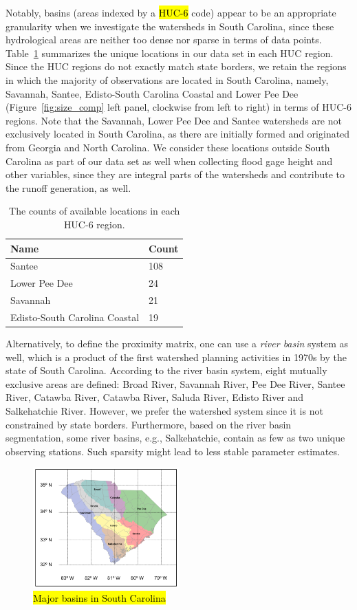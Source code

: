 Notably, basins (areas indexed by a \hl{HUC-6} code) appear to be an appropriate granularity when we investigate the watersheds in South Carolina, since these hydrological areas are neither too dense nor sparse in terms of data points.
Table~\ref{fig:real_huc} summarizes the unique locations in our data set in each HUC region.
Since the HUC regions do not exactly match state borders, we retain the regions in which the majority of observations are located in South Carolina, namely, Savannah, Santee, Edisto-South Carolina Coastal and Lower Pee Dee (Figure~\ref{fig:size_comp} left panel, clockwise from left to right) in terms of HUC-6 regions.
 Note that the Savannah,  Lower Pee Dee and Santee watersheds are not exclusively located in South Carolina, as there are initially formed and originated from Georgia and North Carolina.
 We consider these locations outside South Carolina as part of our data set as well when collecting flood gage height and other variables, since they are integral parts of the watersheds and contribute to the runoff generation, as well.\\

\begin{table}[htbp]
\centering
\begin{tabular}{|l|l|}
\hline
Name & Count\\\hline
Santee & 108\\\hline
Lower Pee Dee&24\\ \hline
Savannah & 21\\ \hline
Edisto-South Carolina Coastal &19\\ \hline
\end{tabular}
\caption{The counts of available locations in each HUC-6 region. }
\label{fig:real_huc}
\end{table}

Alternatively, to define the proximity matrix, one can use a \emph{river basin} system as well, which is a product of the first watershed planning activities in 1970s by the state of South Carolina.
According to the river basin system, eight mutually exclusive areas are defined: Broad River, Savannah River, Pee Dee River, Santee River, Catawba River, Catawba River, Saluda River, Edisto River and Salkehatchie River.
 However, we prefer the watershed system since it is not constrained by state borders.
 Furthermore, based on the river basin  segmentation, some river basins, e.g., Salkehatchie, contain as few as two unique observing stations.
 Such sparsity might lead to less stable parameter estimates.

\begin{figure}[htbp]
\begin{center}
\includegraphics[width=0.5\textwidth]{../images/basin_areas_in_sc.png}
\caption{\hl{Major basins in South Carolina}}
\label{fig:river_basins_}
\end{center}
\end{figure}